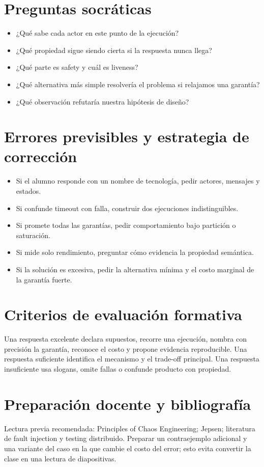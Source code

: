\documentclass[variant=docente,cover=institutional,mode=screen]{ua-engineering-v6-article}
\begin{document}
\section{Preguntas socráticas}
\begin{itemize}
\item ¿Qué sabe cada actor en este punto de la ejecución?
\item ¿Qué propiedad sigue siendo cierta si la respuesta nunca llega?
\item ¿Qué parte es safety y cuál es liveness?
\item ¿Qué alternativa más simple resolvería el problema si relajamos una garantía?
\item ¿Qué observación refutaría nuestra hipótesis de diseño?
\end{itemize}

\section{Errores previsibles y estrategia de corrección}
\begin{itemize}
\item Si el alumno responde con un nombre de tecnología, pedir actores, mensajes y estados.
\item Si confunde timeout con falla, construir dos ejecuciones indistinguibles.
\item Si promete todas las garantías, pedir comportamiento bajo partición o saturación.
\item Si mide solo rendimiento, preguntar cómo evidencia la propiedad semántica.
\item Si la solución es excesiva, pedir la alternativa mínima y el costo marginal de la garantía fuerte.
\end{itemize}

\section{Criterios de evaluación formativa}
Una respuesta excelente declara supuestos, recorre una ejecución, nombra con precisión la garantía, reconoce el costo y propone evidencia reproducible. Una respuesta suficiente identifica el mecanismo y el trade-off principal. Una respuesta insuficiente usa slogans, omite fallas o confunde producto con propiedad.

\section{Preparación docente y bibliografía}
Lectura previa recomendada: Principles of Chaos Engineering; Jepsen; literatura de fault injection y testing distribuido. Preparar un contraejemplo adicional y una variante del caso en la que cambie el costo del error; esto evita convertir la clase en una lectura de diapositivas.
\end{document}
